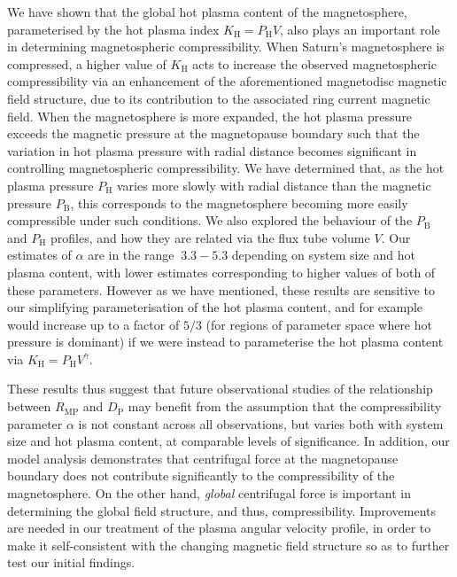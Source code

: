 We have shown that the global hot plasma content of the magnetosphere, parameterised by the hot plasma index $K_\mathrm{H}=P_\mathrm{H}V$, also plays an important role in determining magnetospheric compressibility. When Saturn's magnetosphere is compressed, a higher value of $K_\mathrm{H}$ acts to increase the observed magnetospheric compressibility via an enhancement of the aforementioned magnetodisc magnetic field structure, due to its contribution to the associated ring current magnetic field. When the magnetosphere is more expanded, the hot plasma pressure exceeds the magnetic pressure at the magnetopause boundary such that the variation in hot plasma pressure with radial distance becomes significant in controlling magnetospheric compressibility. We have determined that, as the hot plasma pressure $P_\mathrm{H}$ varies more slowly with radial distance than the magnetic pressure $P_\mathrm{B}$, this corresponds to the magnetosphere becoming more easily compressible under such conditions. We also explored the behaviour of the $P_\mathrm{B}$ and $P_\mathrm{H}$ profiles, and how they are related via the flux tube volume $V$. Our estimates of $\alpha$ are in the range ${~}3.3-5.3$ depending on system size and hot plasma content, with lower estimates corresponding to higher values of both of these parameters. However as we have mentioned, these results are sensitive to our simplifying parameterisation of the hot plasma content, and for example would increase up to a factor of $5/3$ (for regions of parameter space where hot pressure is dominant) if we were instead to parameterise the hot plasma content via $K_\mathrm{H} = P_\mathrm{H}V^\gamma$. 

These results thus suggest that future observational studies of the relationship between $R_\mathrm{MP}$ and $D_\mathrm{P}$ may benefit from the assumption that the compressibility parameter $\alpha$ is not constant across all observations, but varies both with system size and hot plasma content, at comparable levels of significance. In addition, our model analysis demonstrates that centrifugal force at the magnetopause boundary does not contribute significantly to the compressibility of the magnetosphere. On the other hand, \textit{global} centrifugal force is important in determining the global field structure, and thus, compressibility. Improvements are needed in our treatment of the plasma angular velocity profile, in order to make it self-consistent with the changing magnetic field structure so as to further test our initial findings.

